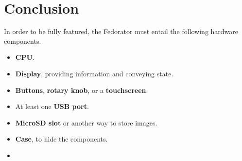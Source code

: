     \section{Conclusion}
        
        In order to be fully featured, the Fedorator must entail the following hardware components.
        \begin{itemize}
            \item \textbf{CPU}.
            \item \textbf{Display}, providing information and conveying state.
            \item \textbf{Buttons}, \textbf{rotary knob}, or a \textbf{touchscreen}.
            \item At least one \textbf{USB port}.
            \item \textbf{MicroSD slot} or another way to store images.
            \item \textbf{Case}, to hide the components.
            \item {}
        \end{itemize}

